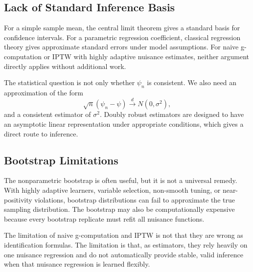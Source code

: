 \subsection{Lack of Standard Inference Basis}

For a simple sample mean, the central limit theorem gives a standard basis for
confidence intervals. For a parametric regression coefficient, classical regression
theory gives approximate standard errors under model assumptions. For naive
g-computation or IPTW with highly adaptive nuisance estimates, neither argument
directly applies without additional work.

The statistical question is not only whether $\psi_n$ is consistent. We also need an
approximation of the form
\[
\sqrt n(\psi_n-\psi)\overset{d}{\longrightarrow}N(0,\sigma^2),
\]
and a consistent estimator of $\sigma^2$. Doubly robust estimators are designed to
have an asymptotic linear representation under appropriate conditions, which gives a
direct route to inference.

\subsection{Bootstrap Limitations}

The nonparametric bootstrap is often useful, but it is not a universal remedy. With
highly adaptive learners, variable selection, non-smooth tuning, or near-positivity
violations, bootstrap distributions can fail to approximate the true sampling
distribution. The bootstrap may also be computationally expensive because every
bootstrap replicate must refit all nuisance functions.

\begin{keyidea}
The limitation of naive g-computation and IPTW is not that they are wrong as
identification formulas. The limitation is that, as estimators, they rely heavily on one
nuisance regression and do not automatically provide stable, valid inference when
that nuisance regression is learned flexibly.
\end{keyidea}
